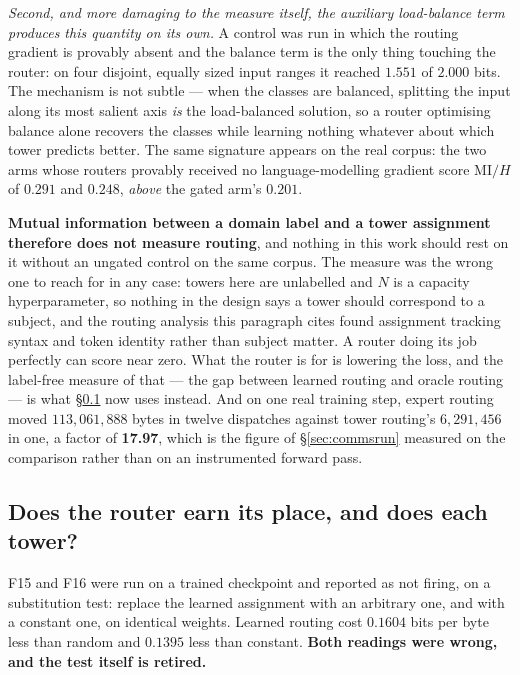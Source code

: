 \documentclass[11pt]{article}
\begin{document}
\emph{Second, and more damaging to the measure itself, the auxiliary load-balance term produces this quantity on its own.} A control was run in which the routing gradient is provably absent and the balance term is the only thing touching the router: on four disjoint, equally sized input ranges it reached $1.551$ of $2.000$ bits. The mechanism is not subtle --- when the classes are balanced, splitting the input along its most salient axis \emph{is} the load-balanced solution, so a router optimising balance alone recovers the classes while learning nothing whatever about which tower predicts better. The same signature appears on the real corpus: the two arms whose routers provably received no language-modelling gradient score MI$/H$ of $0.291$ and $0.248$, \emph{above} the gated arm's $0.201$.

\textbf{Mutual information between a domain label and a tower assignment therefore does not measure routing}, and nothing in this work should rest on it without an ungated control on the same corpus. The measure was the wrong one to reach for in any case: towers here are unlabelled and $N$ is a capacity hyperparameter, so nothing in the design says a tower should correspond to a subject, and the routing analysis this paragraph cites found assignment tracking syntax and token identity rather than subject matter. A router doing its job perfectly can score near zero. What the router is for is lowering the loss, and the label-free measure of that --- the gap between learned routing and oracle routing --- is what \S\ref{sec:f15f16} now uses instead. And on one real training step, expert routing moved $113{,}061{,}888$ bytes in twelve dispatches against tower routing's $6{,}291{,}456$ in one, a factor of \textbf{17.97}, which is the figure of \S\ref{sec:commsrun} measured on the comparison rather than on an instrumented forward pass.

\subsection{Does the router earn its place, and does each tower?}
\label{sec:f15f16}

F15 and F16 were run on a trained checkpoint and reported as not firing, on a substitution test: replace the learned assignment with an arbitrary one, and with a constant one, on identical weights. Learned routing cost $0.1604$ bits per byte less than random and $0.1395$ less than constant. \textbf{Both readings were wrong, and the test itself is retired.}
\end{document}
